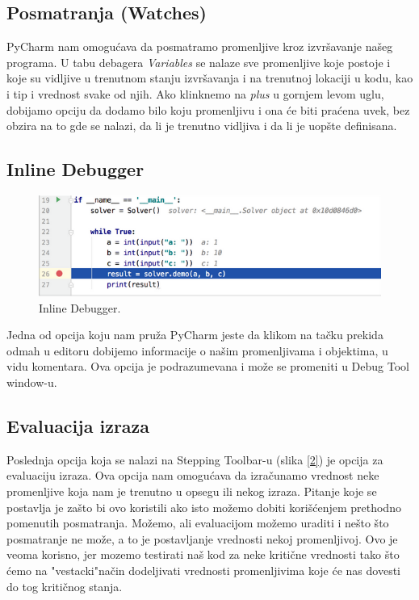 \documentclass[a4paper]{article}
\begin{document}
\subsection{Posmatranja (Watches)}
PyCharm nam omogućava da posmatramo promenljive kroz izvršavanje našeg programa. U tabu debagera \emph{Variables} se nalaze sve promenljive koje postoje i koje su vidljive u trenutnom stanju izvršavanja i na trenutnoj lokaciji u kodu, kao i tip i vrednost svake od njih\cite{pyCharm}. Ako klinknemo na \emph {plus} u gornjem levom uglu, dobijamo opciju da dodamo bilo koju promenljivu i ona će biti praćena uvek, bez obzira na to gde se nalazi, da li je trenutno vidljiva i da li je uopšte definisana\cite{pyCharm}.
\subsection{Inline Debugger}
\begin{figure}[h!]
\begin{center}
\includegraphics[scale = 0.4]{3}
\end{center}
\caption{Inline Debugger.}
\label{3}
\end{figure}
Jedna od opcija koju nam pruža PyCharm jeste da klikom na tačku prekida odmah u editoru dobijemo informacije o našim promenljivama i objektima, u vidu komentara. Ova opcija je podrazumevana i može se promeniti u Debug Tool window-u\cite{pyCharm}.
\subsection{Evaluacija izraza}
Poslednja opcija koja se nalazi na Stepping Toolbar-u (slika \ref{2}) je opcija za evaluaciju izraza. Ova opcija nam omogućava da izračunamo vrednost neke promenljive koja nam je trenutno u opsegu ili nekog izraza\cite{pyCharm}. Pitanje koje se postavlja je zašto bi ovo koristili ako isto možemo dobiti korišćenjem prethodno pomenutih posmatranja. Možemo, ali evaluacijom možemo uraditi i nešto što posmatranje ne može, a to je postavljanje vrednosti nekoj promenljivoj\cite{pyCharm}. Ovo je veoma korisno, jer mozemo testirati naš kod za neke kritične vrednosti tako što ćemo na "vestacki"\space način dodeljivati vrednosti promenljivima koje će nas dovesti do tog kritičnog stanja.
\end{document}

